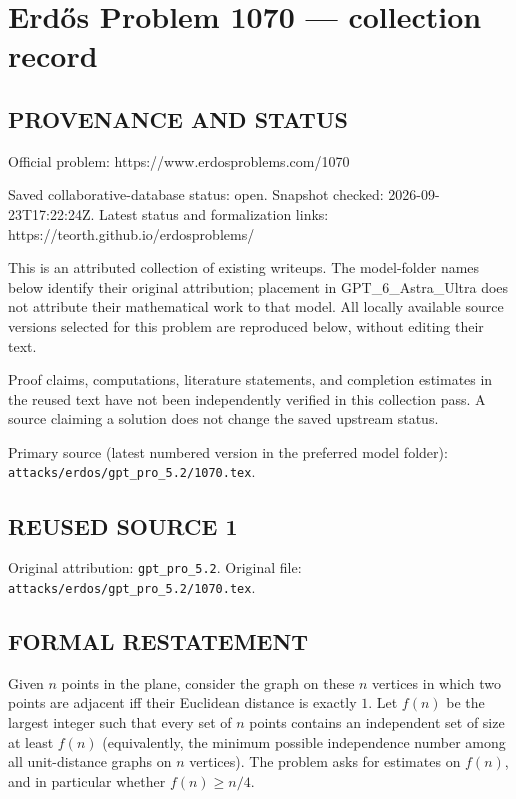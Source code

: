 \section*{Erd\H{o}s Problem 1070 --- collection record}

\subsection*{PROVENANCE AND STATUS}
Official problem: https://www.erdosproblems.com/1070

Saved collaborative-database status: open.
Snapshot checked: 2026-09-23T17:22:24Z.
Latest status and formalization links: https://teorth.github.io/erdosproblems/

This is an attributed collection of existing writeups. The model-folder names below identify their original attribution; placement in GPT\_6\_Astra\_Ultra does not attribute their mathematical work to that model. All locally available source versions selected for this problem are reproduced below, without editing their text.

Proof claims, computations, literature statements, and completion estimates in the reused text have not been independently verified in this collection pass. A source claiming a solution does not change the saved upstream status.

Primary source (latest numbered version in the preferred model folder): \texttt{attacks/erdos/gpt\_pro\_5.2/1070.tex}.

\subsection*{REUSED SOURCE 1}
Original attribution: \texttt{gpt\_pro\_5.2}.
Original file: \texttt{attacks/erdos/gpt\_pro\_5.2/1070.tex}.


\subsection*{FORMAL RESTATEMENT}
Given $n$ points in the plane, consider the graph on these $n$ vertices in which two points are adjacent iff their Euclidean distance is exactly $1$.
Let $f(n)$ be the largest integer such that every set of $n$ points contains an independent set of size at least $f(n)$ (equivalently, the minimum possible independence number among all unit-distance graphs on $n$ vertices).
The problem asks for estimates on $f(n)$, and in particular whether $f(n)\ge n/4$.


